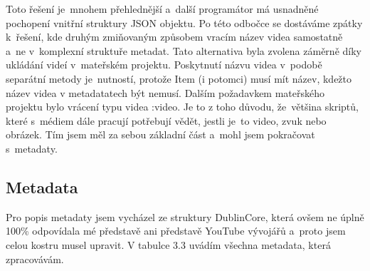 \par Toto řešení je~mnohem přehlednější a~další programátor má usnadněné pochopení vnitřní struktury JSON objektu. Po této odbočce se dostáváme zpátky k~řešení, kde druhým zmiňovaným způsobem vracím název videa samostatně a~ne v~komplexní struktuře metadat. Tato alternativa byla zvolena záměrně díky ukládání videí v~mateřském projektu. Poskytnutí názvu videa v~podobě separátní metody je~nutností, protože Item (i potomci) musí mít název, kdežto název videa v metadatatech být nemusí. Dalším požadavkem mateřského projektu bylo vrácení typu videa :video. Je to z toho důvodu, že~většina skriptů, které s~médiem dále pracují potřebují vědět, jestli je~to video, zvuk nebo obrázek. Tím jsem měl za sebou základní část a~mohl jsem pokračovat s~metadaty.

\subsection{Metadata}

\par Pro popis metadaty jsem vycházel ze struktury DublinCore, která ovšem ne úplně 100\% odpovídala mé představě ani představě YouTube vývojářů a~proto jsem celou kostru musel upravit. V tabulce 3.3 uvádím všechna metadata, která zpracovávám.

